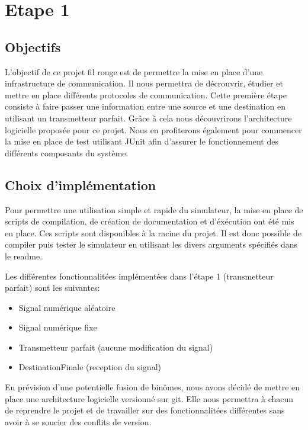 \section{Etape 1}
\subsection{Objectifs}

L'objectif de ce projet fil rouge est de permettre la mise en place d'une infrastructure de communication.
Il nous permettra de décrouvrir, étudier et mettre en place différents protocoles de communication. Cette première étape 
consiste à faire passer une information entre une source et une destination en utilisant
un transmetteur parfait. Grâce à cela nous découvrirons l'architecture logicielle proposée pour ce projet. Nous en profiterons également
pour commencer la mise en place de test utilisant JUnit afin d'assurer le fonctionnement des différents composants du système.

\subsection{Choix d'implémentation}

Pour permettre une utilisation simple et rapide du simulateur, la mise en place de scripts de compilation, de création de documentation et d'éxécution
ont été mis en place. Ces scripts sont disponibles à la racine du projet.
Il est donc possible de compiler puis tester le simulateur en utilisant les divers arguments spécifiés dans le readme.

Les différentes fonctionnalitées implémentées dans l'étape 1 (transmetteur parfait) sont les suivantes:
\begin{itemize}
    \item Signal numérique aléatoire
    \item Signal numérique fixe
    \item Transmetteur parfait (aucune modification du signal)
    \item DestinationFinale (reception du signal)
\end{itemize}

En prévision d'une potentielle fusion de binômes, nous avons décidé de mettre en place une architecture logicielle versionné sur git.
Elle nous permettra à chacun de reprendre le projet et de travailler sur des fonctionnalitées différentes sans avoir à se soucier des conflits de version.

\pagebreak

